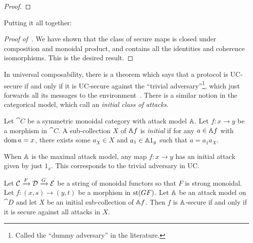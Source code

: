 \begin{proof}
\end{proof}

Putting it all together:

\begin{proof}[Proof of~]
  We have shown that the class of secure maps is closed under composition and
  monoidal product, and contains all the identities and coherence isomorphisms.
  This is the desired result.
\end{proof}

In universal composability, there is a theorem which says that a protocol is
UC-secure if and only if it is UC-secure against the ``trivial
adversary''\footnote{Called the ``dummy adversary'' in the literature.}, which
just forwards all its messages to the environment~\cite[Claim 11]{canetti-2020}.
There is a similar notion in the categorical model, which
\cite{broadbent-karvonen-2022} call an \emph{initial class of attacks}.

\begin{dfn}
  Let $\cat{C}$ be a symmetric monoidal category with attack model $\AA$. Let
  $f: x\to y$ be a morphism in $\cat{C}$. A sub-collection $X$ of $\AA f$ is \emph{initial} if for any
  $a\in\AA f$ with $\dom a = x$, there exists some $a_X\in X$ and $a_1\in\AA
  1_y$ such that $a = a_1a_X$.
\end{dfn}

\begin{ex}
  When $\AA$ is the maximal attack model, any map $f: x\to y$ has an initial
  attack given by just $1_x$. This corresponds to the trivial adversary in UC.
\end{ex}

\begin{thm}
  Let $\cat{C}\xto{F} \cat{D}\xto{G}\cat{E}$ be a string of monoidal functors so
  that $F$ is strong monoidal. Let $f: (x, s)\to (y, t)$ be a morphism in
  $\state{GF}$. Let $\AA$ be an attack model on $\cat{D}$ and let $X$ be an
  initial sub-collection of $\AA f$. Then $f$ is $\AA$-secure if and only if it
  is secure against all attacks in $X$.
\end{thm}


